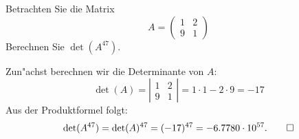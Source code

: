 Betrachten Sie die Matrix
\[
A=\begin{pmatrix}
1&2\\
9&1
\end{pmatrix}
\]
Berechnen Sie $\det(A^{47})$.

\begin{loesung}
Zun"achst berechnen wir die Determinante von $A$:
\[
\det(A)=
\left|
\begin{matrix}
1&2\\
9&1
\end{matrix}
\right|
=1\cdot 1 - 2 \cdot 9 = -17
\]
Aus der Produktformel folgt:
\[
\det(A^{47})
=
\det(A)^{47}
=
(-17)^{47}
=
-6.7780\cdot 10^{57}.
\qedhere
\]
\end{loesung}




